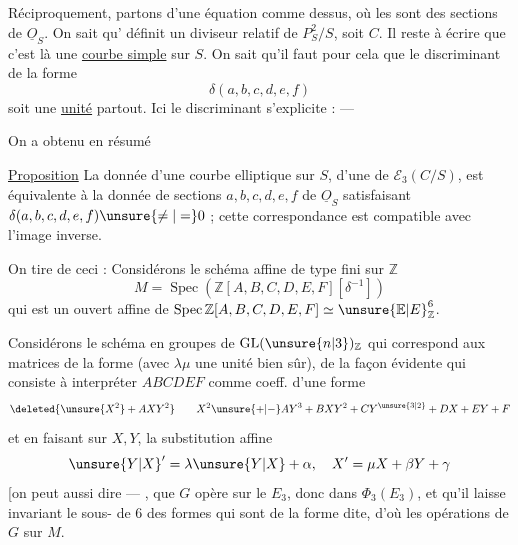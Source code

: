 
Réciproquement, partons d'une équation comme dessus, où les  sont des sections de $\underline O_S$. On sait qu' définit un diviseur relatif  de $P_S^2/S$, soit $C$. Il reste à écrire que c'est là une \uline{courbe simple} sur $S$. On sait qu'il faut pour cela que le discriminant de la forme
\[
\delta(a,b,c,d,e,f)
\]
soit une \uline{unité} partout. Ici le discriminant s'explicite : ---

On a obtenu en résumé

\uline{Proposition} La donnée d'une courbe elliptique sur $S$,  d'une  de $\mathcal E_3(C/S)$,  est équivalente à la donnée de sections $a,b,c,d,e,f$ de $\underline O_S$ satisfaisant $\delta(a,b,c,d,e,f)\unsure{\neq|=}0$ ; cette correspondance est compatible avec l'image inverse.

On tire de ceci : Considérons le schéma affine de type fini sur $\mathbb Z$
\[
M=\operatorname{Spec}(\mathbb Z[A,B,C,D,E,F][\delta^{-1}])
\]
qui est un ouvert affine de $\operatorname{Spec}\mathbb Z[A,B,C,D,E,F]\simeq \unsure{\mathbb E|E}_{\mathbb Z}^6$. 



 Considérons le schéma en groupes de $\operatorname{GL}(\unsure{n|3})_{\mathbb Z}$ qui correspond aux matrices de la forme
(avec $\lambda\mu$ une unité bien sûr),  de la façon évidente qui consiste à interpréter $ABCDEF$ comme coeff. d'une forme
\[
\deleted{\unsure{X^2}+AXY^2}\qquad X^2\unsure{+|-}AY^3+BXY^2+CY^{\unsure{3|2}}+DX+EY+F
\]
et en faisant sur $X,Y$, la substitution affine
\[
\unsure{Y|X}'=\lambda\unsure{Y|X}+\alpha,\quad X'=\mu X+\beta Y+\gamma
\]
[on peut aussi dire --- , que $G$ opère sur le  $E_3$, donc dans $\Phi_3(E_3)$, et qu'il laisse invariant le sous- de  $6$ des formes qui sont de la forme dite, d'où les opérations de $G$ sur $M$.

